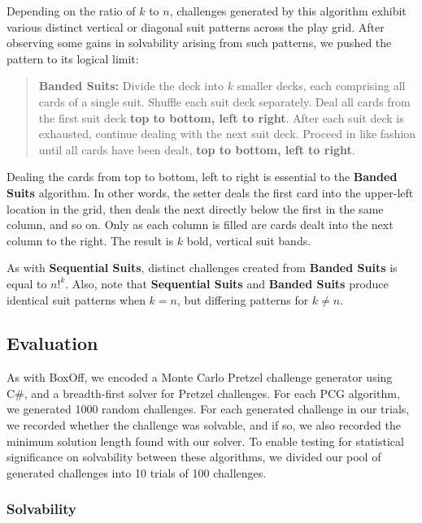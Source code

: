 \documentclass[journal]{IEEEtran}
\begin{document}
Depending on the ratio of $k$ to $n$, challenges generated by this algorithm exhibit various distinct vertical or diagonal suit patterns across the play grid. After observing some gains in solvability arising from such patterns, we pushed the pattern to its logical limit:

\begin{quote}
    {\bf Banded Suits:} Divide the deck into $k$ smaller decks, each comprising all cards of a single suit. Shuffle each suit deck separately. Deal all cards from the first suit deck \textbf{top to bottom, left to right}. After each suit deck is exhausted, continue dealing with the next suit deck. Proceed in like fashion until all cards have been dealt, \textbf{top to bottom, left to right}.
\end{quote}

Dealing the cards from top to bottom, left to right is essential to the \textbf{Banded Suits} algorithm. In other words, the setter deals the first card into the upper-left location in the grid, then deals the next directly below the first in the same column, and so on. Only as each column is filled are cards dealt into the next column to the right. The result is $k$ bold, vertical suit bands.

As with \textbf{Sequential Suits}, distinct challenges created from \textbf{Banded Suits} is equal to $n!^{k}$. Also, note that \textbf{Sequential Suits} and \textbf{Banded Suits} produce identical suit patterns when $k = n$, but differing patterns for $k \neq n$.

\subsection{Evaluation}
\noindent
As with BoxOff, we encoded a Monte Carlo Pretzel challenge generator using C\#, and a breadth-first solver for Pretzel challenges. For each PCG algorithm, we generated 1000 random challenges. For each generated challenge in our trials, we recorded whether the challenge was solvable, and if so, we also recorded the minimum solution length found with our solver. To enable testing for statistical significance on solvability between these algorithms, we divided our pool of generated challenges into 10 trials of 100 challenges. 

\subsubsection{Solvability}
\end{document}

